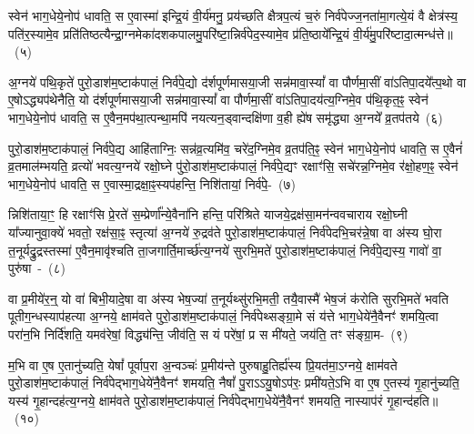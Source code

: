 स्वेन॑ भाग॒\-धेये॒नोप॑ धावति॒ स ए॒वास्मा॑ इन्द्रि॒यं वी॒र्य॑मनु॒ प्रय॑च्छति क्षैत्रप॒त्यं च॒रुं निर्व॑पेज्ज॒नता॑मा॒गत्ये॒यं वै क्षेत्र॑स्य॒ पति॑र॒स्यामे॒व प्रति॑तिष्ठत्यैन्द्रा॒ग्नमेका॑\-दश\-कपालमु॒परि॑ष्टा॒\-न्निर्व॑पेद॒स्यामे॒व प्र॑ति॒ष्ठाये᳚न्द्रि॒यं वी॒र्य॑मु॒परि॑ष्टादा॒त्मन्ध॑त्ते॥~(५)\ip

{\anuvakamend[{प्र॒जाका॑म इन्द्रा॒ग्नी उ॑पप्र॒यात्यै᳚न्द्रा॒ग्नमेका॑\-दश\-कपालं॒ निर्वी॒र्यं॑ पू॒षण॑मे॒वैका॒न्नच॑त्वारि॒ꣳ॒शच्च॑}]}

अ॒ग्नये॑ पथि॒कृते॑ पुरो॒डाश॑\-म॒ष्टा\-क॑पालं॒ निर्व॑पे॒द्यो द॑र्\mbox{}शपूर्णमास\-या॒जी सन्न॑मावा॒स्यां᳚ वा पौर्णमा॒सीं वा॑\-ऽतिपा॒दये᳚त्प॒थो वा ए॒षो\-ऽद्ध्यप॑थेनैति॒ यो द॑र्\mbox{}शपूर्णमासया॒जी सन्न॑मावा॒स्यां᳚ वा पौर्णमा॒सीं वा॑\-ऽतिपा॒दय॑त्य॒ग्निमे॒व प॑थि॒कृत॒ꣴ॒ स्वेन॑ भाग॒\-धेये॒नोप॑ धावति॒ स ए॒वैन॒मप॑था॒त्पन्था॒मपि॑ नयत्यन॒ड्वान्दक्षि॑णा व॒ही ह्ये॑ष समृ॑द्ध्या अ॒ग्नये᳚ व्र॒तप॑तये~(६)\ip

पुरो॒डाश॑\-म॒ष्टा\-क॑पालं॒ निर्व॑पे॒द्य आहि॑ताग्निः॒ सन्न॑व्र॒त्यमि॑व॒ चरे॑द॒ग्निमे॒व व्र॒तप॑ति॒ꣴ॒ स्वेन॑ भाग॒\-धेये॒नोप॑ धावति॒ स ए॒वैनं॑ व्र॒तमाल॑म्भयति॒ व्रत्यो॑ भवत्य॒ग्नये॑ रक्षो॒घ्ने पु॑रो॒डाश॑म॒ष्टा\-क॑पालं॒ निर्व॑पे॒द्यꣳ रक्षाꣳ॑सि॒ सचे॑रन्न॒ग्निमे॒व र॑क्षो॒हण॒ꣴ॒ स्वेन॑ भाग॒\-धेये॒नोप॑ धावति॒ स ए॒वास्मा॒द्रक्षा॒ꣴ॒स्यप॑\-हन्ति॒ निशि॑तायां॒ निर्व॑पे॒-~(७)\ip

न्निशि॑ताया॒ꣳ॒ हि रक्षाꣳ॑सि प्रे॒रते॑ स॒म्प्रेर्णा᳚न्ये॒वैना॑नि हन्ति॒ परि॑श्रिते याजये॒द्रक्ष॑सा॒\-मन॑न्वव\-चाराय रक्षो॒घ्नी या᳚ज्यानुवा॒क्ये॑ भवतो॒ रक्ष॑सा॒ꣴ॒ स्तृत्या॑ अ॒ग्नये॑ रु॒द्रव॑ते पुरो॒डाश॑\-म॒ष्टा\-क॑पालं॒ निर्व॑पेदभि॒चर॑न्ने॒षा वा अ॑स्य घो॒रा त॒नूर्यद्रु॒द्रस्तस्मा॑ ए॒वैन॒मावृ॑श्चति ता॒जगार्ति॒मार्च्छ॑त्य॒ग्नये॑ सुरभि॒मते॑ पुरो॒डाश॑\-म॒ष्टा\-क॑पालं॒ निर्व॑पे॒द्यस्य॒ गावो॑ वा॒ पुरु॑षा~-~(८)\ip

वा प्र॒मीये॑र॒न्॒ यो वा॑ बिभी॒यादे॒षा वा अ॑स्य भेष॒ज्या॑ त॒नूर्यथ्सु॑रभि॒मती॒ तयै॒वास्मै॑ भेष॒जं क॑रोति सुरभि॒मते॑ भवति पूतीग॒न्धस्याप॑हत्या अ॒ग्नये॒ क्षाम॑वते पुरो॒डाश॑\-म॒ष्टा\-क॑पालं॒ निर्व॑पेथ्सङ्ग्रा॒मे सं य॑त्ते भाग॒\-धेये॑नै॒वैनꣳ॑ शमयि॒त्वा परा॑न॒भि निर्दि॑शति॒ यमव॑रेषां॒ विद्ध्य॑न्ति॒ जीव॑ति॒ स यं परे॑षां॒ प्र स मी॑यते॒ जय॑ति॒ तꣳ स॑ङ्ग्रा॒म-~(९)\ip

म॒भि वा ए॒ष ए॒तानु॑च्यति॒ येषां᳚ पूर्वाप॒रा अ॒न्वञ्चः॑ प्र॒मीय॑न्ते पुरुषाहु॒तिर्ह्य॑स्य प्रि॒यत॑मा॒\-ऽग्नये॒ क्षाम॑वते पुरो॒डाश॑\-म॒ष्टा\-क॑पालं॒ निर्व॑पेद्भाग॒\-धेये॑नै॒वैनꣳ॑ शमयति॒ नैषां᳚ पु॒रा\-ऽऽ\-यु॒षो\-ऽप॑रः॒ प्रमी॑यते॒\-ऽभि वा ए॒ष ए॒तस्य॑ गृ॒हानु॑च्यति॒ यस्य॑ गृ॒हान्दह॑त्य॒ग्नये॒ क्षाम॑वते पुरो॒डाश॑\-म॒ष्टा\-क॑पालं॒ निर्व॑पेद्भाग॒\-धेये॑नै॒वैनꣳ॑ शमयति॒ नास्याप॑रं गृ॒हान्द॑हति॥~(१०)\ip

